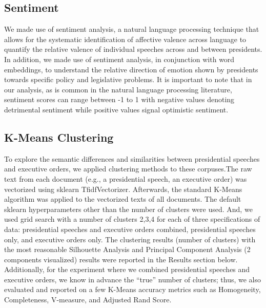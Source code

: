 \documentclass{article}
\begin{document}
{\subsection{Sentiment}{We made use of sentiment analysis, a natural language processing technique that allows for the systematic identification of affective valence across language to quantify the relative valence of individual speeches across and between presidents.  In addition, we made use of sentiment analysis, in conjunction with word embeddings, to understand the relative direction of emotion shown by presidents towards specific policy and legislative problems. It is important to note that in our analysis, as is common in the natural language processing literature, sentiment scores can range between -1 to 1 with negative values denoting detrimental sentiment while positive values signal optimistic sentiment.  
}

\subsection{K-Means Clustering}{To explore the semantic differences and similarities between presidential speeches and executive orders, we applied clustering methods to these corpuses.The raw text from each document (e.g., a presidential speech, an executive order) was vectorized using sklearn TfidfVectorizer. Afterwards, the standard K-Means algorithm was applied to the vectorized texts of all documents. The default sklearn hyperparameters other than the number of clusters were used. And, we used grid search with a number of clusters {2,3,4} for each of three specifications of data: presidential speeches and executive orders combined, presidential speeches only, and executive orders only. The clustering results (number of clusters) with the most reasonable Silhouette Analysis and Principal Component Analysis (2 components visualized) results were reported in the Results section below. Additionally, for the experiment where we combined presidential speeches and executive orders, we know in advance the “true” number of clusters; thus, we also evaluated and reported on a few K-Means accuracy metrics such as Homogeneity, Completeness, V-measure, and Adjusted Rand Score.
}

}
\end{document}
